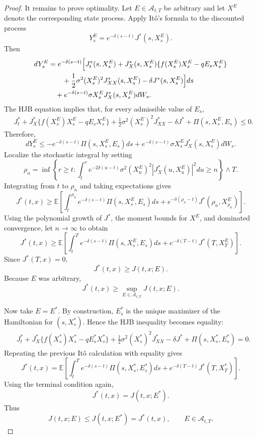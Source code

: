 \documentclass[11pt]{article}
\begin{document}
\begin{proof}
		It remains to prove optimality. Let $E\in\mathcal{A}_{t,T}$ be arbitrary and let $X^E$ denote the corresponding state process. Apply It\^o's formula to the discounted process
		\[
		Y_s^E=e^{-\delta(s-t)}J^*(s,X_s^E).
		\]
		Then
		\[
		\begin{aligned}
			dY_s^E
			&=
			e^{-\delta(s-t)}
			\Bigl[
			J_t^*(s,X_s^E)
			+
			J_X^*(s,X_s^E)
			\{f(X_s^E)X_s^E-qE_sX_s^E\}
			\\
			&\qquad
			+
			\frac12\sigma^2(X_s^E)^2J_{XX}^*(s,X_s^E)
			-
			\delta J^*(s,X_s^E)
			\Bigr]ds
			\\
			&\quad
			+
			e^{-\delta(s-t)}
			\sigma X_s^EJ_X^*(s,X_s^E)dW_s .
		\end{aligned}
		\]
		The HJB equation implies that, for every admissible value of $E_s$,
		\[
		\begin{aligned}
			&J_t^*
			+
			J_X^*
			\{f(X_s^E)X_s^E-qE_sX_s^E\}
			+
			\frac12\sigma^2(X_s^E)^2J_{XX}^*
			-
			\delta J^*
			+
			\Pi(s,X_s^E,E_s)
			\le0.
		\end{aligned}
		\]
		Therefore,
		\[
		dY_s^E
		\le
		-e^{-\delta(s-t)}
		\Pi(s,X_s^E,E_s)ds
		+
		e^{-\delta(s-t)}
		\sigma X_s^EJ_X^*(s,X_s^E)dW_s .
		\]
		Localize the stochastic integral by setting
		\[
		\rho_n
		=
		\inf
		\left\{
		r\ge t:
		\int_t^r
		e^{-2\delta(u-t)}
		\sigma^2(X_u^E)^2
		|J_X^*(u,X_u^E)|^2du
		\ge n
		\right\}
		\wedge T.
		\]
		Integrating from $t$ to $\rho_n$ and taking expectations gives
		\[
		J^*(t,x)
		\ge
		\mathbb{E}
		\left[
		\int_t^{\rho_n}
		e^{-\delta(s-t)}
		\Pi(s,X_s^E,E_s)ds
		+
		e^{-\delta(\rho_n-t)}
		J^*(\rho_n,X_{\rho_n}^E)
		\right].
		\]
		Using the polynomial growth of $J^*$, the moment bounds for $X^E$, and dominated convergence, let $n\to\infty$ to obtain
		\[
		J^*(t,x)
		\ge
		\mathbb{E}
		\left[
		\int_t^T
		e^{-\delta(s-t)}
		\Pi(s,X_s^E,E_s)ds
		+
		e^{-\delta(T-t)}
		J^*(T,X_T^E)
		\right].
		\]
		Since $J^*(T,x)=0$,
		\[
		J^*(t,x)
		\ge
		J(t,x;E).
		\]
		Because $E$ was arbitrary,
		\[
		J^*(t,x)\ge \sup_{E\in\mathcal{A}_{t,T}}J(t,x;E).
		\]
		
		Now take $E=E^*$. By construction, $E_s^*$ is the unique maximizer of the Hamiltonian for $(s,X_s^*)$. Hence the HJB inequality becomes equality:
		\[
		\begin{aligned}
			&J_t^*
			+
			J_X^*
			\{f(X_s^*)X_s^*-qE_s^*X_s^*\}
			+
			\frac12\sigma^2(X_s^*)^2J_{XX}^*
			-
			\delta J^*
			+
			\Pi(s,X_s^*,E_s^*)
			=
			0.
		\end{aligned}
		\]
		Repeating the previous It\^o calculation with equality gives
		\[
		J^*(t,x)
		=
		\mathbb{E}
		\left[
		\int_t^T
		e^{-\delta(s-t)}
		\Pi(s,X_s^*,E_s^*)ds
		+
		e^{-\delta(T-t)}
		J^*(T,X_T^*)
		\right].
		\]
		Using the terminal condition again,
		\[
		J^*(t,x)
		=
		J(t,x;E^*).
		\]
		Thus
		\[
		J(t,x;E)\le J(t,x;E^*)=J^*(t,x),
		\qquad
		E\in\mathcal{A}_{t,T}.
		\]
		

\end{proof}
\end{document}
